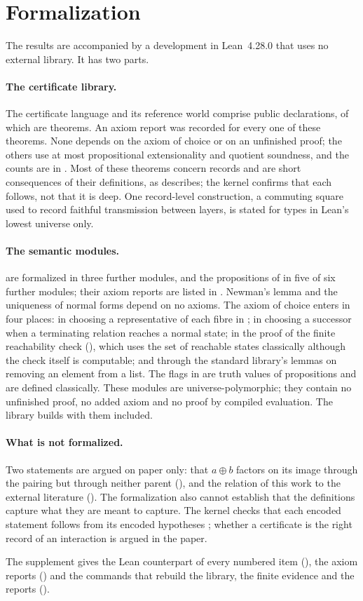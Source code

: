 \section{Formalization}
\label{sec:lean}

The results are accompanied by a development in Lean~4.28.0 that uses no external library.
It has two parts.

\paragraph{The certificate library.} The certificate language and its reference world
comprise \publicdecls{} public declarations, of which \publicthms{} are theorems. An axiom
report was recorded for every one of these theorems. None depends on the axiom of choice
or on an unfinished proof; the others use at most propositional extensionality and
quotient soundness, and the counts are in . Most of these theorems
concern records and are short consequences of their definitions, as
 describes; the kernel confirms that each follows, not that it
is deep. One record-level construction, a commuting square used to record faithful
transmission between layers, is stated for types in Lean's lowest universe only.

\paragraph{The semantic modules.}  are formalized in
three further modules, and the propositions of  in five of six further modules; their axiom
reports are listed in . Newman's
lemma and the uniqueness of normal forms depend on no axioms. The axiom of choice enters
in four places: in choosing a representative of each fibre in
; in choosing a successor when a terminating relation reaches a
normal state; in the proof of the finite reachability check (),
which uses the set of reachable states classically although the check itself is
computable; and through the standard library's lemmas on removing an element from a
list. The flags in  are truth values of propositions and are defined
classically. These modules are universe-polymorphic; they contain no unfinished proof, no
added axiom and no proof by compiled evaluation. The library builds with them included.

\paragraph{What is not formalized.} Two statements are argued on paper only: that
$a\oplus b$ factors on its image through the pairing but through neither parent
(), and the relation of this work to the external literature
(). The formalization also cannot
establish that the definitions capture what they are meant to capture. The kernel checks
that each encoded statement follows from its encoded hypotheses
\citep{DeMouraUllrich2021,Pollack1998}; whether a certificate is the right record of an
interaction is argued in the paper.

The supplement gives the Lean counterpart of every numbered item
(), the axiom reports () and the commands that
rebuild the library, the finite evidence and the reports ().
